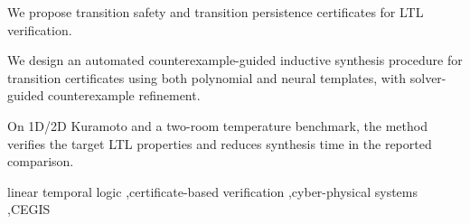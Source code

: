 \documentclass[a4paper,fleqn]{cas-sc}
\theoremstyle{definition}
\begin{document}
\begin{highlights}
\item We propose transition safety and transition persistence certificates for LTL verification.
\item We design an automated counterexample-guided inductive synthesis procedure for transition certificates using both polynomial and neural templates, with solver-guided counterexample refinement.
\item On 1D/2D Kuramoto and a two-room temperature benchmark, the method verifies the target LTL properties and reduces synthesis time in the reported comparison.
\end{highlights}

\begin{keywords}
linear temporal logic \sep certificate-based verification \sep cyber-physical systems \sep CEGIS
\end{keywords}

\maketitle











\appendix

\end{document}

